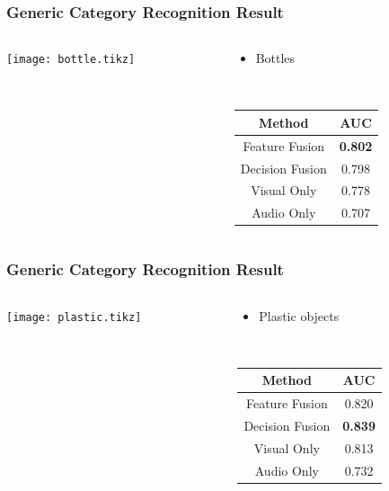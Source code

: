 \documentclass[t]{beamer}
\begin{document}
\begin{frame}
  \frametitle{Generic Category Recognition Result}

  \begin{columns}
    \begin{column}{.6\linewidth}
      \centering
      \footnotesize
      \texttt{[image: bottle.tikz]}
    \end{column}
    \begin{column}{.4\linewidth}
      \vspace{-1.4\linewidth}
      \begin{itemize}
        \item Bottles
      \end{itemize}
      ~

      \begin{tabular}[h]{c|c}
        \hline
        Method & AUC \\ \hline \hline
        Feature Fusion & \textbf{0.802} \\ \hline
        Decision Fusion  & 0.798 \\ \hline
        Visual Only & 0.778 \\ \hline
        Audio Only & 0.707 \\ \hline
      \end{tabular}
    \end{column}
  \end{columns}
\end{frame}

\begin{frame}
  \frametitle{Generic Category Recognition Result}

  \begin{columns}
    \begin{column}{.6\linewidth}
      \centering
      \footnotesize
      \texttt{[image: plastic.tikz]}
    \end{column}
    \begin{column}{.4\linewidth}
      \vspace{-1.4\linewidth}
      \begin{itemize}
        \item Plastic objects
      \end{itemize}
      ~

      \begin{tabular}[h]{c|c}
        \hline
        Method & AUC \\ \hline \hline
        Feature Fusion & 0.820 \\ \hline
        Decision Fusion & \textbf{0.839} \\ \hline
        Visual Only & 0.813 \\ \hline
        Audio Only & 0.732 \\ \hline
      \end{tabular}
    \end{column}
  \end{columns}
\end{frame}
\end{document}
